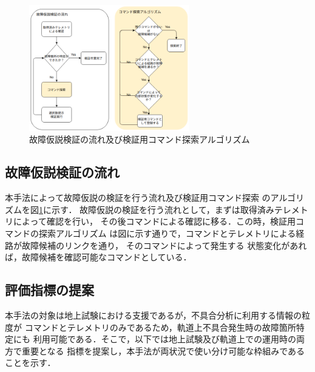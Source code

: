 \documentclass[11pt]{jsarticle}%
\begin{document}
\begin{multicols}{2}

\begin{figure}[H]
  \centering
    \includegraphics[height=5.5cm]{../figure/COM_search_algorithm.png}
    \caption{故障仮説検証の流れ及び検証用コマンド探索アルゴリズム}%
    \label{fig:algorithm}
\end{figure}
\subsection{故障仮説検証の流れ}
本手法によって故障仮説の検証を行う流れ及び検証用コマンド探索
のアルゴリズムを図\ref{fig:algorithm}に示す．
故障仮説の検証を行う流れとして，まずは取得済みテレメトリによって確認を行い，
その後コマンドによる確認に移る．この時，検証用コマンドの探索アルゴリズム
は図に示す通りで，コマンドとテレメトリによる経路が故障候補のリンクを通り，
そのコマンドによって発生する
状態変化があれば，故障候補を確認可能なコマンドとしている．%

\vspace{-1zh}
\subsection{評価指標の提案}
本手法の対象は地上試験における支援であるが，不具合分析に利用する情報の粒度が
コマンドとテレメトリのみであるため，軌道上不具合発生時の故障箇所特定にも
利用可能である．そこで，以下では地上試験及び軌道上での運用時の両方で重要となる
指標を提案し，本手法が両状況で使い分け可能な枠組みであることを示す．
\vspace{-1zh}

\end{multicols}
\end{document}
